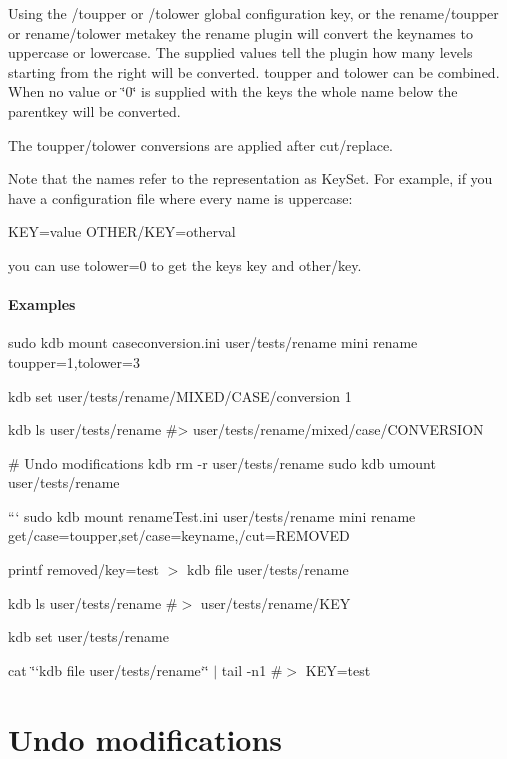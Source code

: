 Using the {\ttfamily /toupper} or {\ttfamily /tolower} global configuration key, or the {\ttfamily rename/toupper} or {\ttfamily rename/tolower} metakey the rename plugin will convert the keynames to uppercase or lowercase. The supplied values tell the plugin how many levels starting from the right will be converted. {\ttfamily toupper} and {\ttfamily tolower} can be combined. When no value or \char`\"{}0\char`\"{} is supplied with the keys the whole name below the parentkey will be converted.

The toupper/tolower conversions are applied after cut/replace.

Note that the names refer to the representation as Key\+Set. For example, if you have a configuration file where every name is uppercase\+: \begin{DoxyVerb}KEY=value
OTHER/KEY=otherval
\end{DoxyVerb}


you can use {\ttfamily tolower=0} to get the keys {\ttfamily key} and {\ttfamily other/key}.

\paragraph*{Examples}


\begin{DoxyCode}
sudo kdb mount caseconversion.ini user/tests/rename mini rename toupper=1,tolower=3

kdb set user/tests/rename/MIXED/CASE/conversion 1

kdb ls user/tests/rename
#> user/tests/rename/mixed/case/CONVERSION

# Undo modifications
kdb rm -r user/tests/rename
sudo kdb umount user/tests/rename
\end{DoxyCode}


``` sudo kdb mount rename\+Test.\+ini user/tests/rename mini rename get/case=toupper,set/case=keyname,/cut=R\+E\+M\+O\+V\+ED

printf \textquotesingle{}removed/key=test\textquotesingle{} $>$ {\ttfamily kdb file user/tests/rename}

kdb ls user/tests/rename \#$>$ user/tests/rename/\+K\+EY

kdb set user/tests/rename

cat \char`\"{}`kdb file user/tests/rename`\char`\"{} $\vert$ tail -\/n1 \#$>$ K\+EY=test

\section*{Undo modifications}

